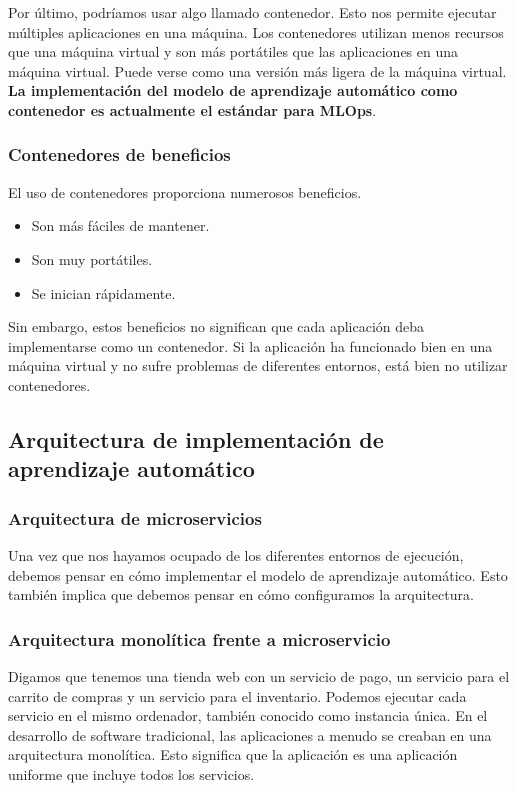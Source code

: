 \documentclass[10pt]{book}
\begin{document}
Por último, podríamos usar algo llamado contenedor. Esto nos permite ejecutar múltiples aplicaciones en una máquina. Los contenedores utilizan menos recursos que una máquina virtual y son más portátiles que las aplicaciones en una máquina virtual. Puede verse como una versión más ligera de la máquina virtual. \textbf{La implementación del modelo de aprendizaje automático como contenedor es actualmente el estándar para MLOps}.

\subsubsection{Contenedores de beneficios}
El uso de contenedores proporciona numerosos beneficios. 
\begin{itemize}
	\item Son más fáciles de mantener.
	\item Son muy portátiles.
	\item Se inician rápidamente.
\end{itemize}
Sin embargo, estos beneficios no significan que cada aplicación deba implementarse como un contenedor. Si la aplicación ha funcionado bien en una máquina virtual y no sufre problemas de diferentes entornos, está bien no utilizar contenedores.


\subsection{Arquitectura de implementación de aprendizaje automático}

\subsubsection{Arquitectura de microservicios}
Una vez que nos hayamos ocupado de los diferentes entornos de ejecución, debemos pensar en cómo implementar el modelo de aprendizaje automático. Esto también implica que debemos pensar en cómo configuramos la arquitectura.

\subsubsection{Arquitectura monolítica frente a microservicio}
Digamos que tenemos una tienda web con un servicio de pago, un servicio para el carrito de compras y un servicio para el inventario. Podemos ejecutar cada servicio en el mismo ordenador, también conocido como instancia única. En el desarrollo de software tradicional, las aplicaciones a menudo se creaban en una arquitectura monolítica. Esto significa que la aplicación es una aplicación uniforme que incluye todos los servicios.
\end{document}
